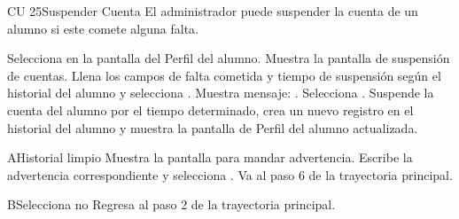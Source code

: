 \begin{UseCase} {CU 25}{Suspender Cuenta}{
	El administrador puede suspender la cuenta de un alumno si este comete alguna falta.
}




\end{UseCase}


\begin{UCtrayectoria}
	
	\UCpaso [\UCactor]	Selecciona  en la pantalla del Perfil del alumno. 
	\UCpaso [\UCsist]Muestra la pantalla de suspensión de cuentas.
	\UCpaso [\UCactor]Llena los campos de falta cometida y tiempo de suspensión según el historial del alumno y selecciona .
	\UCpaso [\UCsist]Muestra mensaje: .
	\UCpaso [\UCactor]Selecciona .
	\UCpaso [\UCsist]Suspende la cuenta del alumno por el tiempo determinado, crea un nuevo registro en el historial del alumno y muestra la pantalla de Perfil del alumno actualizada.
\end{UCtrayectoria}



\begin{UCtrayectoriaA}{A}{Historial limpio}
	\UCpaso [\UCsist]Muestra la pantalla para mandar advertencia.
	\UCpaso [\UCactor]	Escribe la advertencia correspondiente y selecciona .
	\UCpaso Va al paso 6 de la trayectoria principal.
\end{UCtrayectoriaA}

\begin{UCtrayectoriaA}{B}{Selecciona no}
	\UCpaso Regresa al paso 2 de la trayectoria principal.
\end{UCtrayectoriaA}
